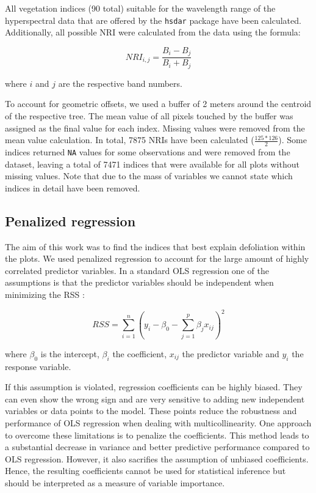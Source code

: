 \documentclass[review]{elsarticle}
\begin{document}
All vegetation indices (90 total) suitable for the wavelength range of the hyperspectral data that are offered by the \texttt{hsdar} package have been calculated.
Additionally, all possible \ac{NRI} were calculated from the data using the formula:

\begin{equation}
	NRI_{i,j} = \frac{B_{i} - B_{j}}{B_{i} + B_{j}}
\end{equation}

\noindent
where $i$ and $j$ are the respective band numbers.

To account for geometric offsets, we used a buffer of 2 meters around the centroid of the respective tree.
The mean value of all pixels touched by the buffer was assigned as the final value for each index.
Missing values were removed from the mean value calculation.
In total, 7875 \ac{NRI}s have been calculated ($\frac{125*126}{2}$).
Some indices returned \texttt{NA} values for some observations and were removed from the dataset, leaving a total of 7471 indices that were available for all plots without missing values.
Note that due to the mass of variables we cannot state which indices in detail have been removed.

\subsection{Penalized regression}

The aim of this work was to find the indices that best explain defoliation within the plots.
We used penalized regression to account for the large amount of highly correlated predictor variables.
In a standard \ac{OLS} regression one of the assumptions is that the predictor variables should be independent when minimizing the \ac{RSS} \citep{Bare1981, Hastie2001}:

\begin{equation}
	RSS = \sum_{i=1}^{n} \left(y_{i} - \beta_{0} - \sum_{j=1}^{p} \beta_{j} x_{ij} \right) ^{2}
\end{equation}

where $\beta_{0}$ is the intercept, $\beta_{i}$ the coefficient, $x_{ij}$ the predictor variable and $y_{i}$ the response variable.

If this assumption is violated, regression coefficients can be highly biased.
They can even show the wrong sign and are very sensitive to adding new independent variables or data points to the model.
These points reduce the robustness and performance of \ac{OLS} regression when dealing with multicollinearity.
One approach to overcome these limitations is to penalize the coefficients.
This method leads to a substantial decrease in variance and better predictive performance compared to \ac{OLS} regression.
However, it also sacrifies the assumption of unbiased coefficients.
Hence, the resulting coefficients cannot be used for statistical inference but should be interpreted as a measure of variable importance.
\end{document}

